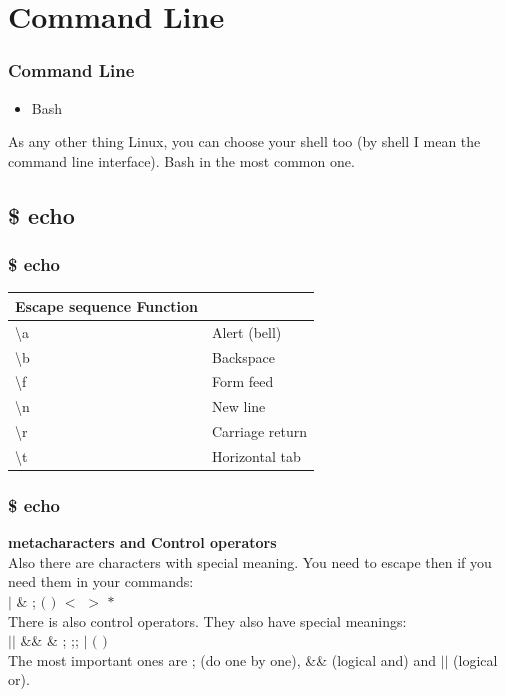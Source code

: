 \documentclass{beamer}
\begin{document}

\section{Command Line}
\begin{frame}
\frametitle{Command Line}
\begin{itemize}
\item Bash
\end{itemize}
As any other thing Linux, you can choose your shell too (by shell I mean the command line interface). Bash in the most common one.


\end{frame}

\subsection{\$ echo}
\begin{frame}
\frametitle{\$ echo}
 \par
\vspace{0.15cm}
 \par
\vspace{0.15cm}
\begin{table}
\begin{tabular}{l l}
\toprule
\textbf{Escape sequence Function} & \textbf{}\\
\midrule
\textbackslash a & Alert (bell) \\
\textbackslash b & Backspace \\
\textbackslash f & Form feed \\
\textbackslash n & New line \\
\textbackslash r & Carriage return \\
\textbackslash t & Horizontal tab \\
\bottomrule
\end{tabular}
\end{table}
\end{frame}

\begin{frame}\frametitle{\$ echo}
{\bf metacharacters and Control operators}\\
Also there are characters with special meaning. You need to escape then if you need them in your commands:\\
$|$ \& ; $($ $)$ $<$ $>$ $*$ \\
There is also control operators. They also have special meanings:\\
$||$ \&\& \& ; ;; $|$ $($ $)$ \\
The most important ones are ; (do one by one), \&\& (logical and) and $||$ (logical or). 
\end{frame}
\end{document}
